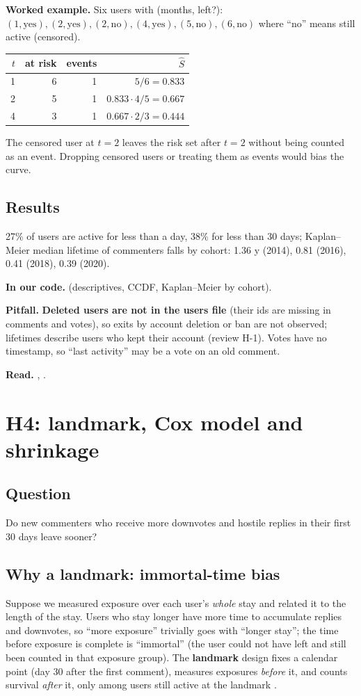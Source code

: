 \documentclass[11pt,a4paper]{article}
\newcommand{\file}[1]{\path{#1}}
\newcommand{\inour}[1]{\par\textbf{In our code.} #1}
\newcommand{\pitfall}[1]{\par\textbf{Pitfall.} #1}
\newcommand{\readref}[1]{\par\textbf{Read.} #1}
\begin{document}
\textbf{Worked example.} Six users with (months, left?): $(1,\text{yes}),(2,\text{yes}),(2,\text{no}),(4,\text{yes}),(5,\text{no}),(6,\text{no})$ where ``no'' means still active (censored).\par\smallskip
\begin{tabular}{@{}rrrr@{}}
\toprule
$t$ & at risk & events & $\hat S$\\
\midrule
1 & 6 & 1 & $5/6=0.833$\\
2 & 5 & 1 & $0.833\cdot4/5=0.667$\\
4 & 3 & 1 & $0.667\cdot2/3=0.444$\\
\bottomrule
\end{tabular}

The censored user at $t=2$ leaves the risk set after $t=2$ without being counted as an event. Dropping censored users or treating them as events would bias the curve.

\subsection*{Results}
27\% of users are active for less than a day, 38\% for less than 30 days; Kaplan--Meier median lifetime of commenters falls by cohort: 1.36 y (2014), 0.81 (2016), 0.41 (2018), 0.39 (2020).

\inour{\file{06_lifetime.py} (descriptives, CCDF, Kaplan--Meier by cohort).}
\pitfall{\textbf{Deleted users are not in the users file} (their ids are missing in comments and votes), so exits by account deletion or ban are not observed; lifetimes describe users who kept their account (review H-1). Votes have no timestamp, so ``last activity'' may be a vote on an old comment.}
\readref{\cite{km}, \cite{kleinbaum}.}

\section{H4: landmark, Cox model and shrinkage}\label{sec:h4}
\subsection*{Question}
Do new commenters who receive more downvotes and hostile replies in their first 30 days leave sooner?

\subsection{Why a landmark: immortal-time bias}
Suppose we measured exposure over each user's \emph{whole} stay and related it to the length of the stay. Users who stay longer have more time to accumulate replies and downvotes, so ``more exposure'' trivially goes with ``longer stay''; the time before exposure is complete is ``immortal'' (the user could not have left and still been counted in that exposure group). The \textbf{landmark} design fixes a calendar point (day 30 after the first comment), measures exposures \emph{before} it, and counts survival \emph{after} it, only among users still active at the landmark \cite{suissa,anderson}.
\end{document}
